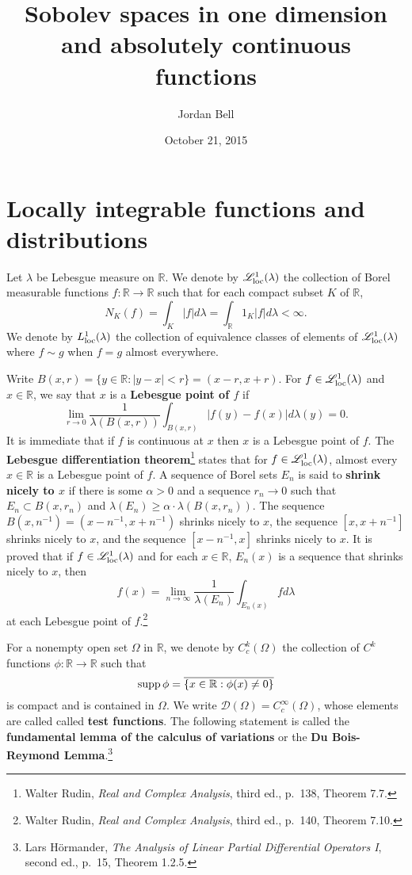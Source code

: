 \documentclass{article}
\newcommand{\supp}{\ensuremath\mathrm{supp}\,}
\newcommand{\Lsemiloc}{\mathscr{L}_{\ensuremath\mathrm{loc}}^1(\lambda)}
\newcommand{\Lloc}{L_{\ensuremath\mathrm{loc}}^1(\lambda)}
\theoremstyle{definition}
\begin{document}
\title{Sobolev spaces in one dimension and absolutely continuous functions}
\author{Jordan Bell}
\date{October 21, 2015}

\maketitle

\section{Locally integrable functions and distributions}
Let $\lambda$ be Lebesgue measure on $\mathbb{R}$. We denote
by
 $\Lsemiloc$ the collection of Borel measurable functions 
$f:\mathbb{R} \to \mathbb{R}$  such that for each compact subset $K$ of  $\mathbb{R}$,
\[
N_K(f) = \int_K |f| d\lambda  =  \int_\mathbb{R} 1_K |f| d\lambda < \infty.
\]  
We denote by $\Lloc$ the collection of equivalence classes of elements
of $\Lsemiloc$ where $f \sim g$ when $f=g$ almost everywhere. 

Write $B(x,r) = \{y \in \mathbb{R} : |y-x|<r\}=(x-r,x+r)$. For $f \in \Lsemiloc$ and $x \in \mathbb{R}$, we say that
$x$ is a \textbf{Lebesgue point of $f$} if 
\[
\lim_{r \to 0} \frac{1}{\lambda(B(x,r))} \int_{B(x,r)} |f(y)-f(x)| d\lambda(y) = 0.
\]
It is immediate that if $f$ is continuous at $x$ then $x$ is a Lebesgue point of $f$.
The \textbf{Lebesgue differentiation theorem}\footnote{Walter Rudin, {\em Real and Complex Analysis}, third ed., p.~138,
Theorem 7.7.} states that for $f \in \Lsemiloc$, almost every $x \in \mathbb{R}$ is a Lebesgue point of
$f$. 
A sequence of Borel sets $E_n$ is said to \textbf{shrink nicely to $x$} if there is some $\alpha>0$ and a sequence
 $r_n \to 0$ such that $E_n \subset B(x,r_n)$ and $\lambda(E_n) \geq \alpha \cdot \lambda(B(x,r_n))$. 
The sequence $B(x,n^{-1})=(x-n^{-1},x+n^{-1})$ shrinks nicely to $x$, the sequence
$[x,x+n^{-1}]$ shrinks nicely to $x$, and the sequence $[x-n^{-1},x]$ shrinks nicely to $x$. 
It is proved that if $f \in \Lsemiloc$ and for each $x \in \mathbb{R}$, $E_n(x)$ is a sequence that shrinks nicely to $x$, then 
\[
f(x) = \lim_{n \to \infty} \frac{1}{\lambda(E_n)} \int_{E_n(x)} f d\lambda
\]
at each Lebesgue point of $f$.\footnote{Walter Rudin, {\em Real and Complex Analysis}, third ed., p.~140,
Theorem 7.10.}




For a nonempty open set $\Omega$ in $\mathbb{R}$, we denote by $C_c^k(\Omega)$ the collection of $C^k$ functions
$\phi:\mathbb{R} \to \mathbb{R}$ such that
\[
\supp \phi = \overline{\{x \in \mathbb{R}: \phi(x) \neq 0\}}
\]
is compact and is contained in $\Omega$. 
We write $\mathscr{D}(\Omega)=C_c^\infty(\Omega)$, whose elements are called called \textbf{test functions}. 
The following statement is called the \textbf{fundamental lemma of the calculus of variations} or the \textbf{Du Bois-Reymond Lemma}.\footnote{Lars H\"ormander,
{\em The Analysis of Linear Partial Differential Operators I}, second ed., p.~15, Theorem 1.2.5.}
\end{document}
